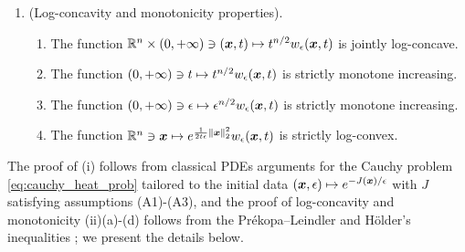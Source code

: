\begin{lem}
\begin{enumerate}
\item[(ii)]  (Log-concavity and monotonicity properties).
\begin{enumerate}
\item The function $\mathbb{R}^n\times(0,+\infty)\ni(\boldsymbol{x},t)\mapsto t^{n/2}w_{\epsilon}(\boldsymbol{x},t)$ is jointly log-concave.
\item The function $(0,+\infty)\ni t\mapsto t^{n/2}w_{\epsilon}(\boldsymbol{x},t)$ is strictly monotone increasing.
\item The function $(0,+\infty)\ni\epsilon\mapsto\epsilon^{n/2}w_{\epsilon}(\boldsymbol{x},t)$ is strictly monotone increasing.
\item The function $\mathbb{R}^n\ni\boldsymbol{x}\mapsto e^{\frac{1}{2t\epsilon}\left\Vert{\boldsymbol{x}} \right\Vert_{2}^{2}}w_{\epsilon}(\boldsymbol{x},t)$ is strictly log-convex.
\end{enumerate}
\end{enumerate}
\end{lem}
The proof of (i) follows from classical PDEs arguments for the Cauchy problem \eqref{eq:cauchy_heat_prob} tailored to the initial data $(\boldsymbol{x},\epsilon)\mapsto e^{-J(\boldsymbol{x})/\epsilon}$ with $J$ satisfying assumptions (A1)-(A3), and the proof of log-concavity and monotonicity (ii)(a)-(d) follows from the Pr\'ekopa--Leindler and H\"older's inequalities \citep{leindler1972certain, prekopa1971logarithmic,folland2013real}; we present the details below.


